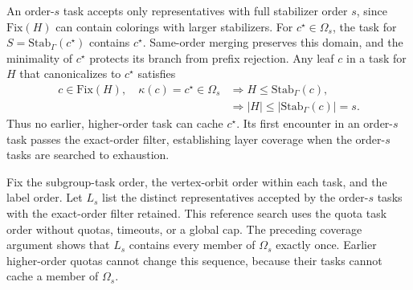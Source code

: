 \documentclass[a5paper, 10pt]{article}
\begin{document}
An order-$s$ task accepts only representatives with full stabilizer order $s$, since $\mathrm{Fix}(H)$ can contain colorings with larger stabilizers. For $c^\star\in\Omega_s$, the task for $S=\mathrm{Stab}_{\Gamma}(c^\star)$ contains $c^\star$. Same-order merging preserves this domain, and the minimality of $c^\star$ protects its branch from prefix rejection. Any leaf $c$ in a task for $H$ that canonicalizes to $c^\star$ satisfies
\begin{equation}
\begin{aligned}
c\in\mathrm{Fix}(H),\quad \kappa(c)=c^\star\in\Omega_s
&\Longrightarrow H\leq\mathrm{Stab}_{\Gamma}(c),\\
&\Longrightarrow |H|\leq|\mathrm{Stab}_{\Gamma}(c)|=s.
\end{aligned}
\label{eq:quota_layer_order}
\end{equation}
Thus no earlier, higher-order task can cache $c^\star$. Its first encounter in an order-$s$ task passes the exact-order filter, establishing layer coverage when the order-$s$ tasks are searched to exhaustion.

Fix the subgroup-task order, the vertex-orbit order within each task, and the label order. Let $L_s$ list the distinct representatives accepted by the order-$s$ tasks with the exact-order filter retained. This reference search uses the quota task order without quotas, timeouts, or a global cap. The preceding coverage argument shows that $L_s$ contains every member of $\Omega_s$ exactly once. Earlier higher-order quotas cannot change this sequence, because their tasks cannot cache a member of $\Omega_s$.
\end{document}
